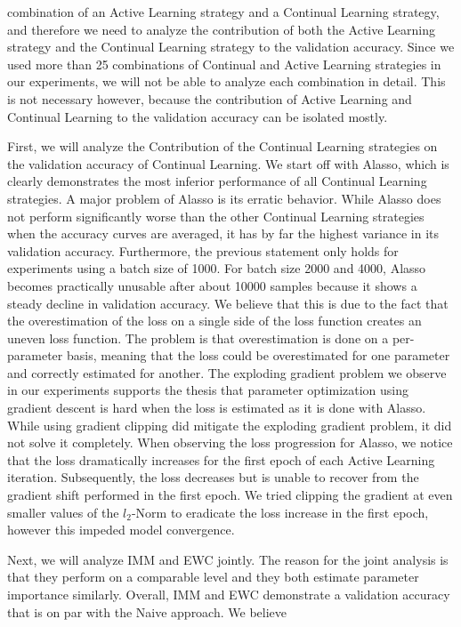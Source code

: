 combination of an Active Learning strategy and a Continual Learning strategy, and therefore we need to analyze the contribution of both the Active Learning strategy and the Continual Learning strategy to the validation accuracy. Since we used more than 25 combinations of Continual
and Active Learning strategies in our experiments, we will not be able to analyze each combination in detail. This is not necessary however, because the contribution of Active Learning and Continual Learning to the validation accuracy can be isolated mostly. \par
First, we will analyze the Contribution of the Continual Learning strategies on the validation accuracy of Continual Learning. We start off with Alasso, which is clearly demonstrates the most inferior performance of all Continual Learning strategies. A major problem of Alasso is
its erratic behavior. While Alasso does not perform significantly worse than the other Continual Learning strategies when the accuracy curves are averaged, it has by far the highest variance in its validation accuracy. Furthermore, the previous statement only holds for experiments
using a batch size of 1000. For batch size 2000 and 4000, Alasso becomes practically unusable after about 10000 samples because it shows a steady decline in validation accuracy. We believe that this is due to the fact that the overestimation of the loss on a single side of the 
loss function creates an uneven loss function. The problem is that overestimation is done on a per-parameter basis, meaning that the loss could be overestimated for one parameter and correctly estimated for another. The exploding gradient problem we observe in our experiments
supports the thesis that parameter optimization using gradient descent is hard when the loss is estimated as it is done with Alasso. While using gradient clipping did mitigate the exploding gradient problem, it did not solve it completely. When observing the loss progression for
Alasso, we notice that the loss dramatically increases for the first epoch of each Active Learning iteration. Subsequently, the loss decreases but is unable to recover from the gradient shift performed in the first epoch. We tried clipping the gradient at even smaller values of
the $l_2$-Norm to eradicate the loss increase in the first epoch, however this impeded model convergence. \par
Next, we will analyze IMM and EWC jointly. The reason for the joint analysis is that they perform on a comparable level and they both estimate parameter importance similarly. Overall, IMM and EWC demonstrate a validation accuracy that is on par with the Naive approach. We believe
